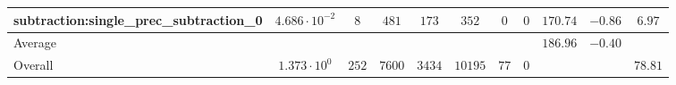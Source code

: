 \begin{tabular}{|l|c|c|c|c|c|c|c|c|c|c|}
subtraction:single\_prec\_subtraction\_0         & $ 4.686 \cdot 10^{-2} $ & $ 8      $ & $ 481  $ & $ 173  $ & $ 352   $ & $ 0  $ & $ 0 $ & $ 170.74      $ & $ -0.86   $ & $ 6.97    $ \\
\hline
Average                                          & $                     $ & $        $ & $      $ & $      $ & $       $ & $    $ & $   $ & $ 186.96      $ & $ -0.40   $ & $         $ \\
\hline
Overall                                          & $ 1.373 \cdot 10^{0}  $ & $ 252    $ & $ 7600 $ & $ 3434 $ & $ 10195 $ & $ 77 $ & $ 0 $ & $             $ & $         $ & $ 78.81   $ \\
\hline
\end{tabular}
